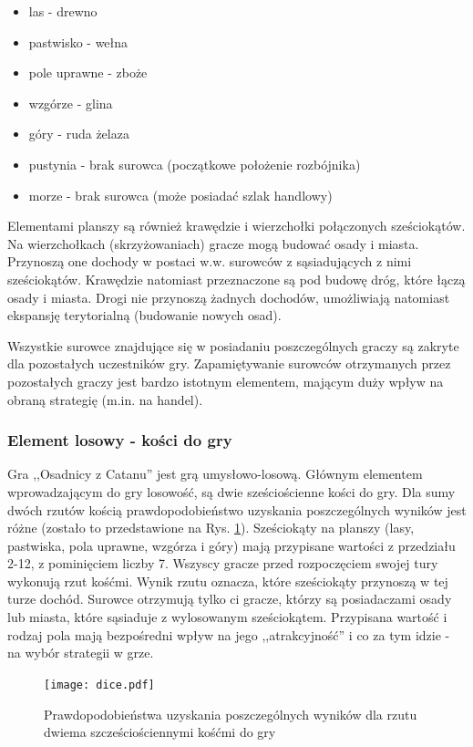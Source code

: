 \documentclass[a4paper,12pt]{article}
\providecommand{\imref}[1]{Rys. \ref{#1}} %
\begin{document}
\begin{itemize}
\item las - drewno
\item pastwisko - wełna
\item pole uprawne - zboże
\item wzgórze - glina
\item góry - ruda żelaza
\item pustynia - brak surowca (początkowe położenie rozbójnika)
\item morze - brak surowca (może posiadać szlak handlowy)
\end{itemize}

Elementami planszy są również krawędzie i wierzchołki połączonych
sześciokątów. Na wierzchołkach (skrzyżowaniach) gracze mogą budować
osady i miasta. Przynoszą one dochody w postaci w.w. surowców z
sąsiadujących z nimi sześciokątów. Krawędzie natomiast przeznaczone są
pod budowę dróg, które łączą osady i miasta. Drogi nie przynoszą
żadnych dochodów, umożliwiają natomiast ekspansję terytorialną
(budowanie nowych osad).

Wszystkie surowce znajdujące się w posiadaniu poszczególnych graczy są
zakryte dla pozostałych uczestników gry. Zapamiętywanie surowców
otrzymanych przez pozostałych graczy jest bardzo istotnym elementem,
mającym duży wpływ na obraną strategię (m.in. na handel).

\subsubsection{Element losowy - kości do gry}
Gra ,,Osadnicy z Catanu'' jest grą umysłowo-losową. Głównym elementem
wprowadzającym do gry losowość, są dwie sześciościenne kości do
gry. Dla sumy dwóch rzutów kością prawdopodobieństwo uzyskania
poszczególnych wyników jest różne (zostało to przedstawione na
\imref{dice}). Sześciokąty na planszy (lasy, pastwiska, pola uprawne,
wzgórza i góry) mają przypisane wartości z przedziału 2-12, z
pominięciem liczby 7. Wszyscy gracze przed rozpoczęciem swojej tury
wykonują rzut kośćmi. Wynik rzutu oznacza, które sześciokąty przynoszą
w tej turze dochód. Surowce otrzymują tylko ci gracze, którzy są
posiadaczami osady lub miasta, które sąsiaduje z wylosowanym
sześciokątem. Przypisana wartość i rodzaj pola mają bezpośredni wpływ
na jego ,,atrakcyjność'' i co za tym idzie - na wybór strategii w
grze.

\begin{figure}[ht]
  \begin{center}
    \texttt{[image: dice.pdf]}
  \end{center}
  \caption{Prawdopodobieństwa uzyskania poszczególnych wyników dla
    rzutu dwiema szcześciościennymi kośćmi do gry}
  \label{dice}
\end{figure}
\end{document}
